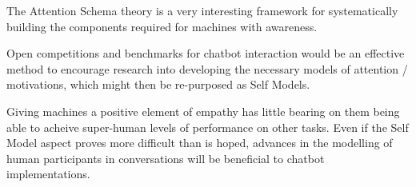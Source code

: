 \documentclass[citeauthoryear]{llncs}
\begin{document}
The Attention Schema theory is a very interesting framework for 
systematically building the components required for machines with awareness.

Open competitions and benchmarks for chatbot interaction would be 
an effective method to encourage research into developing the necessary 
models of attention / motivations, which might then be re-purposed as Self Models.

Giving machines a positive element of empathy has little bearing on 
them being able to acheive super-human levels of performance on other tasks.
%
Even if the Self Model aspect proves more difficult than is hoped, 
advances in the modelling of human participants in conversations will
be beneficial to chatbot implementations.  




%
%
\end{document}
